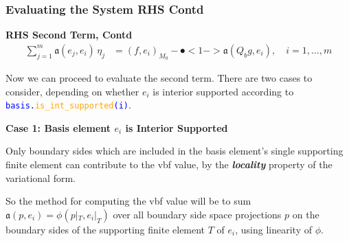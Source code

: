 \documentclass[compress]{beamer}
\begin{document}
\begin{frame}
  \frametitle{Evaluating the System RHS Contd}
  \vspace{-.15cm}
  \textbf{RHS Second Term, Contd}
  \vspace{-.20cm}
  \begin{align*}
    \sum_{j=1}^m{\mathfrak{a}(e_j, e_i) \,\eta_j} &= (f, e_i)_{M_0} - \spot<1->{\mathfrak{a}(Q_b g, e_i)}, \quad i=1,\dots,m
  \end{align*}
  
  \uncover<+-> {
  Now we can proceed to evaluate the second term.
  There are two cases to consider, depending on whether $e_i$ is interior supported according to 
  {\small \texttt{\textcolor{blue}{basis.\textcolor{orange}{is\_int\_supported}(i)}}}.
  
  \uncover<+-> {
  \vspace{.1cm}
  \textbf{Case 1: Basis element $e_i$ is Interior Supported}
  \vspace{.1cm}
  
  Only boundary sides which are included in the basis element's single supporting finite element can contribute to the vbf value, by the 
  \emph{\textbf{locality}} property of the variational form.

  \vspace{.1cm}
  \uncover<+-> {
    So the method for computing the vbf value will be to sum $\mathfrak{a}(p, e_i)=\phi(p|_T, e_i|_T)$ over all boundary side space projections
  $p$ on the boundary sides of the supporting finite element $T$ of $e_i$, using linearity of $\phi$.
  }}}
\end{frame}
\end{document}
